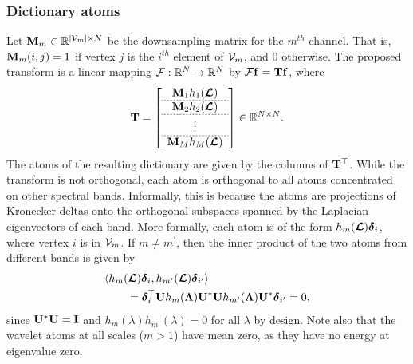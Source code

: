 \documentclass[journal, 10pt]{IEEEtran}
\begin{document}
\subsubsection{Dictionary atoms}
Let ${\bf M}_m \in \R^{|{\cal V}_m| \times N}$ be the downsampling matrix for the $m^{th}$ channel. That is, ${\bf M}_m(i,j)=1$ if vertex $j$ is the $i^{th}$ element of ${\cal V}_m$, and 0 otherwise. The proposed transform is a linear mapping ${\cal F}: \R^N \rightarrow \R^N$ by ${\cal F}{\bf f} = {\bf Tf}$, where 
\begin{align*}
{\bf T}=\left[
\begin{array}{c}
{\bf M}_1 h_1(\L) \\  \hdashline[.05cm/.05cm]
{\bf M}_2 h_2(\L) \\  \hdashline[.05cm/.05cm]
\vdots \\  \hdashline[.05cm/.05cm]
{\bf M}_M h_M(\L)
\end{array}
\right] \in \R^{N \times N}.
\end{align*}
The atoms of the resulting dictionary are given by the columns of ${\bf T}^{\top}$. While the transform is not orthogonal, each atom is orthogonal to all atoms concentrated on other spectral bands. Informally, this is because the atoms are projections of Kronecker deltas onto the orthogonal subspaces spanned by the Laplacian eigenvectors of each band. More formally, each atom is of the form $h_m(\boldsymbol{\mathcal{L}}){\boldsymbol \delta}_i$, where vertex $i$ is in ${\cal V}_m$. If $m \neq m^{\prime}$, then the inner product of the two atoms from different bands is given by
\begin{align} \label{Eq:ortho_bands}
&\langle h_m(\L){\boldsymbol \delta}_i , h_{m^{\prime}}(\L){\boldsymbol \delta}_{i^{\prime}} \rangle \nonumber \\
&~~~~~~= {\boldsymbol \delta}_i^{\top} {\bf U} h_m({\boldsymbol \Lambda}) {\bf U}^* {\bf U} h_{m^{\prime}}({\boldsymbol \Lambda}) {\bf U}^* {\boldsymbol \delta}_{i^{\prime}}= 0,
\end{align}
since ${\bf U}^* {\bf U}={\bf I}$ and $h_m(\lambda)h_{m^{\prime}}(\lambda)=0$ for all $\lambda$ by design.
Note also that the wavelet atoms at all scales ($m>1$) have mean zero, as they have no energy at eigenvalue zero.
\end{document}
